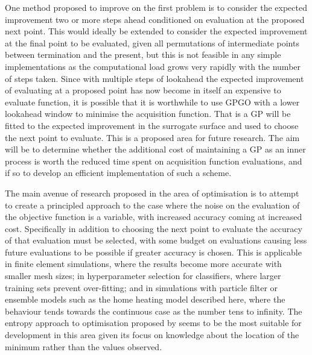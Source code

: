 \documentclass[a4paper, 10 pt, conference]{ieeeconf}  %
\begin{document}
One method proposed to improve on the first problem is to consider the expected improvement two or more steps ahead conditioned on evaluation at the proposed next point. This would ideally be extended to consider the expected improvement at the final point to be evaluated, given all permutations of intermediate points between termination and the present, but this is not feasible in any simple implementations as the computational load grows very rapidly with the number of steps taken. Since with multiple steps of lookahead the expected improvement of evaluating at a proposed point has now become in itself an expensive to evaluate function, it is possible that it is worthwhile to use GPGO with a lower lookahead window to minimise the acquisition function. That is a GP will be fitted to the expected improvement in the surrogate surface and used to choose the next point to evaluate. This is a proposed area for future research. The aim will be to determine whether the additional cost of maintaining a GP as an inner process is worth the reduced time spent on acquisition function evaluations, and if so to develop an efficient implementation of such a scheme.

The main avenue of research proposed in the area of optimisation is to attempt to create a principled approach to the case where the noise on the evaluation of the objective function is a variable, with increased accuracy coming at increased cost. Specifically in addition to choosing the next point to evaluate the accuracy of that evaluation must be selected, with some budget on evaluations causing less future evaluations to be possible if greater accuracy is chosen. This is applicable in finite element simulations, where the results become more accurate with smaller mesh sizes; in hyperparameter selection for classifiers, where larger training sets prevent over-fitting; and in simulations with particle filter or ensemble models such as the home heating model described here, where the behaviour tends towards the continuous case as the number tens to infinity. The entropy approach to optimisation proposed by \cite{hennig2012entropy} seems to be the most suitable for development in this area given its focus on knowledge about the location of the minimum rather than the values observed.
\end{document}
